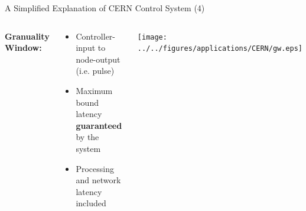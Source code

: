 \documentclass[compress,red]{beamer}
\begin{document}
\begin{frame}{A Simplified Explanation of CERN Control System (4)}

\begin{columns}[c]
   {\bf Granuality Window: }
    \begin{center}
      \begin{itemize}
	    \item Controller-input to node-output (i.e. pulse)
	    \item Maximum bound latency {\bf guaranteed } by the system
	    \item Processing and network latency included
      \end{itemize}

    \end{center}
    \begin{center}
      \begin{center}
      \texttt{[image: ../../figures/applications/CERN/gw.eps]}
      \end{center}
    \end{center}
\end{columns}

\end{frame}
\end{document}
